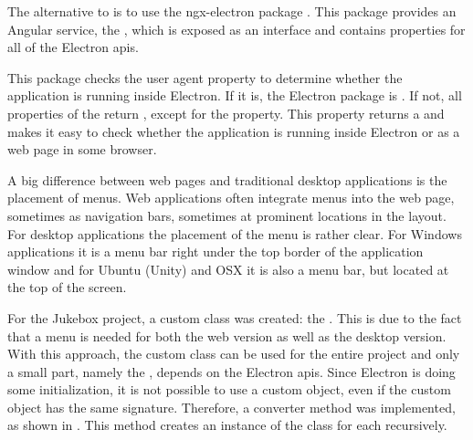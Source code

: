 
The alternative to  is to use the ngx-electron package \cite{ngxElectron}. This package provides an Angular service, the , which is exposed as an interface and contains properties for all of the Electron \gls{api}s.

This package checks the user agent property to determine whether the application is running inside Electron. If it is, the Electron package is . If not, all properties of the  return , except for the  property. This property returns a  and makes it easy to check whether the application is running inside Electron or as a web page in some browser.


A big difference between web pages and traditional desktop applications is the placement of menus. Web applications often integrate menus into the web page, sometimes as navigation bars, sometimes at prominent locations in the layout. For desktop applications the placement of the menu is rather clear. For Windows applications it is a menu bar right under the top border of the application window and for Ubuntu (Unity) and OSX it is also a menu bar, but located at the top of the screen.



For the Jukebox project, a custom  class was created: the . This is due to the fact that a menu is needed for both the web version as well as the desktop version. With this approach, the custom class can be used for the entire project and only a small part, namely the , depends on the Electron \gls{api}s. Since Electron is doing some initialization, it is not possible to use a custom  object, even if the custom object has the same signature. Therefore, a converter method was implemented, as shown in . This method creates an instance of the  class for each  recursively.


\newpage


